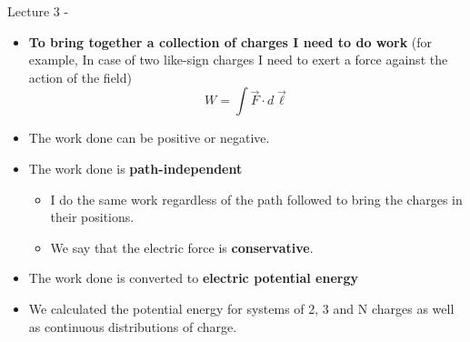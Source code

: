 
\renewcommand{\summarizedlecture}{3 }

%
%
%

\begin{frame}{Lecture \summarizedlecture - \lecturesummarytitle}

\begin{itemize}
\item {\bf To bring together a collection of charges I need to do work}
      (for example, In case of two like-sign charges I need to exert a force against the action of the field)
      \begin{equation*}
        W = \int \vec{F} \cdot d\vec{\ell}
      \end{equation*}
\item The work done can be positive or negative.
\item The work done is {\bf path-independent}
  \begin{itemize}
     \item I do the same work regardless of the path followed to bring the charges in their positions.
     \item We say that the electric force is {\bf conservative}.
  \end{itemize}
\item The work done is converted to {\bf electric potential energy}
\item We calculated the  potential energy for systems of 2, 3 and N charges as well as continuous distributions of charge.

\end{itemize}

\end{frame}

%
%
%

